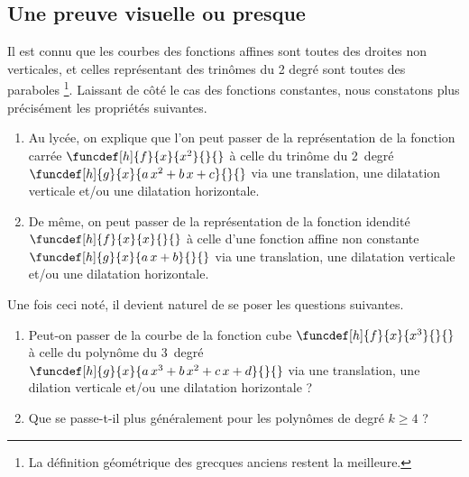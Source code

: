 \subsection{Une preuve visuelle ou presque}

\leavevmode
\smallskip




Il est connu que les courbes des fonctions affines sont toutes des droites non verticales, et celles représentant des trinômes du 2\ieme{} degré sont toutes des paraboles
\footnote{
	La définition géométrique des grecques anciens restent la meilleure.
}.
Laissant de côté le cas des fonctions constantes, nous constatons plus précisément les propriétés suivantes.
%
\begin{enumerate}
	\item Au lycée, on explique que l'on peut passer de la représentation de la fonction carrée 
	$\funcdef[h]{f}{x}{x^2}{}{}$ 
	à celle du trinôme du 2\ieme\ degré
	$\funcdef[h]{g}{x}{a \, x^2 + b \, x + c}{}{}$
	via une translation, une dilatation verticale et/ou une dilatation horizontale.


	\item De même, on peut passer de la représentation de la fonction idendité
	$\funcdef[h]{f}{x}{x}{}{}$ 
	à celle d'une fonction affine non constante
	$\funcdef[h]{g}{x}{a \, x + b}{}{}$
	via une translation, une dilatation verticale et/ou une dilatation horizontale.
\end{enumerate}


Une fois ceci noté, il devient naturel de se poser les questions suivantes.
%
\begin{enumerate}	
	\item Peut-on passer de la courbe de la fonction cube
	$\funcdef[h]{f}{x}{x^3}{}{}$
	à celle du polynôme du 3\ieme\ degré
	$\funcdef[h]{g}{x}{a \, x^3 + b \, x^2 + c \, x + d}{}{}$
	via une translation, une dilation verticale et/ou une dilatation horizontale ?

	\item Que se passe-t-il plus généralement pour les polynômes de degré  $k \geq 4$ ?
\end{enumerate}

 